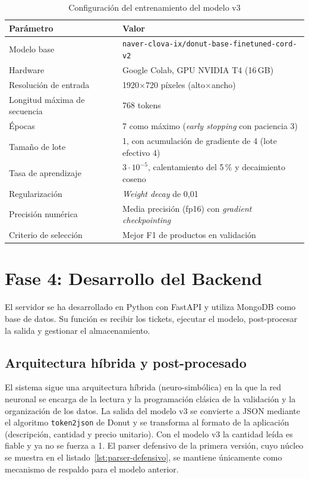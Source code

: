 \begin{table}[htbp]
    \caption{\label{tab:hiperparametros}Configuración del entrenamiento del modelo v3}
    \begin{tabularx}{\textwidth}{@{}lX@{}}
        \toprule
        \textbf{Parámetro} & \textbf{Valor} \\
        \midrule
        Modelo base & \texttt{naver-clova-ix/donut-base-finetuned-cord-v2} \\
        Hardware & Google Colab, GPU NVIDIA T4 (16\,GB) \\
        Resolución de entrada & 1920$\times$720 píxeles (alto$\times$ancho) \\
        Longitud máxima de secuencia & 768 tokens \\
        Épocas & 7 como máximo (\textit{early stopping} con paciencia 3) \\
        Tamaño de lote & 1, con acumulación de gradiente de 4 (lote efectivo 4) \\
        Tasa de aprendizaje & $3\cdot10^{-5}$, calentamiento del 5\,\% y decaimiento coseno \\
        Regularización & \textit{Weight decay} de 0,01 \\
        Precisión numérica & Media precisión (fp16) con \textit{gradient checkpointing} \\
        Criterio de selección & Mejor F1 de productos en validación \\
        \bottomrule
    \end{tabularx}
\end{table}

\section{Fase 4: Desarrollo del Backend}
El servidor se ha desarrollado en Python con FastAPI y utiliza MongoDB como base de datos. Su función es recibir los tickets, ejecutar el modelo, post-procesar la salida y gestionar el almacenamiento.

\subsection{Arquitectura híbrida y post-procesado}
El sistema sigue una arquitectura híbrida (neuro-simbólica) en la que la red neuronal se encarga de la lectura y la programación clásica de la validación y la organización de los datos. La salida del modelo v3 se convierte a JSON mediante el algoritmo \texttt{token2json} de Donut y se transforma al formato de la aplicación (descripción, cantidad y precio unitario). Con el modelo v3 la cantidad leída es fiable y ya no se fuerza a 1. El parser defensivo de la primera versión, cuyo núcleo se muestra en el listado~\ref{lst:parser-defensivo}, se mantiene únicamente como mecanismo de respaldo para el modelo anterior.


